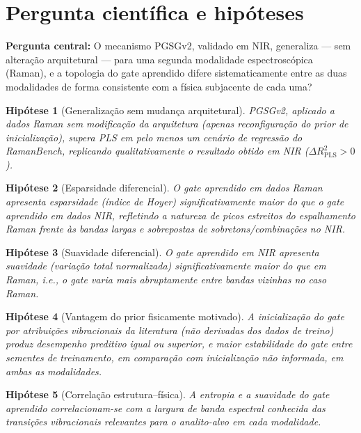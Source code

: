 \documentclass[11pt,a4paper]{article}
\newtheorem{hypothesis}{Hipótese}
\begin{document}
\section{Pergunta científica e hipóteses}

\textbf{Pergunta central:} O mecanismo PGSGv2, validado em NIR, generaliza --- sem alteração arquitetural --- para uma segunda modalidade espectroscópica (Raman), e a topologia do gate aprendido difere sistematicamente entre as duas modalidades de forma consistente com a física subjacente de cada uma?

\begin{hypothesis}[Generalização sem mudança arquitetural]
PGSGv2, aplicado a dados Raman sem modificação da arquitetura (apenas reconfiguração do prior de inicialização), supera PLS em pelo menos um cenário de regressão do RamanBench, replicando qualitativamente o resultado obtido em NIR ($\Delta R^2_{\text{PLS}} > 0$).
\end{hypothesis}

\begin{hypothesis}[Esparsidade diferencial]
O gate aprendido em dados Raman apresenta esparsidade (índice de Hoyer) significativamente maior do que o gate aprendido em dados NIR, refletindo a natureza de picos estreitos do espalhamento Raman frente às bandas largas e sobrepostas de sobretons/combinações no NIR.
\end{hypothesis}

\begin{hypothesis}[Suavidade diferencial]
O gate aprendido em NIR apresenta suavidade (variação total normalizada) significativamente maior do que em Raman, i.e., o gate varia mais abruptamente entre bandas vizinhas no caso Raman.
\end{hypothesis}

\begin{hypothesis}[Vantagem do prior fisicamente motivado]
A inicialização do gate por atribuições vibracionais da literatura (não derivadas dos dados de treino) produz desempenho preditivo igual ou superior, e maior estabilidade do gate entre sementes de treinamento, em comparação com inicialização não informada, em ambas as modalidades.
\end{hypothesis}

\begin{hypothesis}[Correlação estrutura--física]
A entropia e a suavidade do gate aprendido correlacionam-se com a largura de banda espectral conhecida das transições vibracionais relevantes para o analito-alvo em cada modalidade.
\end{hypothesis}
\end{document}
